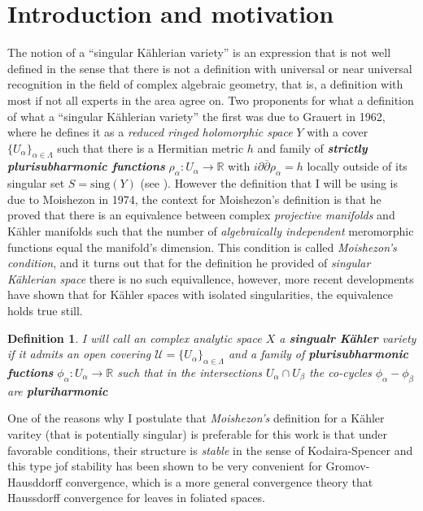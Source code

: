 \documentclass[12pt,twoside,a4paper]{report}
\newtheorem{definition}{Definition}[section]
\newcommand{\re}{\ensuremath{\mathbb R }}
\begin{document}
\section{Introduction and motivation}
\noindent The notion of a ``singular Kählerian variety'' is an expression that is not well defined in the sense that there is not a definition with universal or near universal recognition in the field of complex algebraic geometry, that is, a definition with most if not all experts in the area agree on. Two proponents for what a definition of what a ``singular Kählerian variety'' the first was due to Grauert in 1962, where he defines it as a \emph{reduced ringed holomorphic space} $Y$ with a cover $\{U_\alpha\}_{\alpha\in\Lambda}$ such that there is a Hermitian metric $h$ and family of \emph{\textbf{strictly plurisubharmonic functions}} $\rho_\alpha:U_\alpha\to\re$ with $i\partial\overline{\partial}\rho_\alpha=h
$ locally outside of its singular set $S=\mathrm{sing}(Y)$ (see \cite{Grauert2}). However the definition that I will be using is due to Moishezon in 1974, the context for Moishezon's definition is that he proved that there is an equivalence between complex \emph{projective manifolds} and Kähler manifolds such that the number of \emph{algebraically independent} meromorphic functions equal the manifold's dimension. This condition is called \emph{Moishezon's condition}, and it turns out that for the definition he provided of \emph{singular Kählerian space} there is no such equivallence, however, more recent developments have shown that for Kähler spaces with isolated singularities, the equivalence holds true still.
\begin{definition}
  I will call an complex analytic space $X$ a \textbf{singualr Kähler} variety if it admits an open covering $\mathcal{U}=\{U_{\alpha}\}_{\alpha\in\Lambda}$ and a family of \textbf{plurisubharmonic fuctions} $\phi_{\alpha}:U_{\alpha}\to\re$ such that in the intersections $U_{\alpha}\cap U_{\beta}$ the co-cycles $\phi_{\alpha}-\phi_{\beta}$ are \textbf{pluriharmonic}
\end{definition}
One of the reasons why I postulate that \emph{Moishezon's} definition for a Kähler varitey (that is potentially singular) is preferable for this work is that under favorable conditions, their structure is \emph{stable} in the sense of Kodaira-Spencer and this type jof stability has been shown to be very convenient for Gromov-Hausddorff convergence, which is a more general convergence theory that Haussdorff convergence for leaves in foliated spaces.
\end{document}
